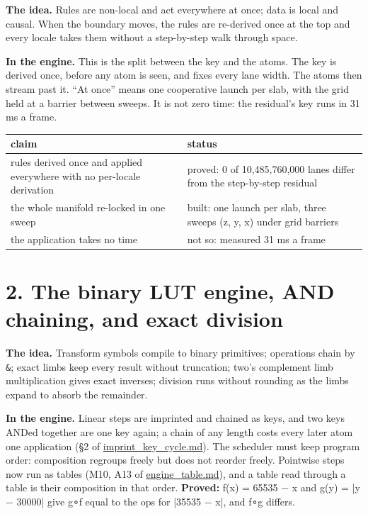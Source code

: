\textbf{The idea.} Rules are non-local and act everywhere at once; data is local and causal. When the boundary moves, the rules are re-derived once at the top and every locale takes them without a step-by-step walk through space.

\textbf{In the engine.} This is the split between the key and the atoms. The key is derived once, before any atom is seen, and fixes every lane width. The atoms then stream past it. “At once” means one cooperative launch per slab, with the grid held at a barrier between sweeps. It is not zero time: the residual's key runs in 31 ms a frame.

{\small
\setlength{\tabcolsep}{6pt}
\begin{longtable}{>{\RaggedRight\arraybackslash}p{}>{\RaggedRight\arraybackslash}p{}}
\toprule
claim & status \\
\midrule
\endhead
rules derived once and applied everywhere with no per-locale derivation & proved: 0 of 10,485,760,000 lanes differ from the step-by-step residual \\
the whole manifold re-locked in one sweep & built: one launch per slab, three sweeps (z, y, x) under grid barriers \\
the application takes no time & not so: measured 31 ms a frame \\
\bottomrule
\end{longtable}
}

\section{\texorpdfstring{2. The binary LUT engine, AND chaining, and exact division}{2. The binary LUT engine, AND chaining, and exact division}}

\textbf{The idea.} Transform symbols compile to binary primitives; operations chain by \texttt{\&}; exact limbs keep every result without truncation; two's complement limb multiplication gives exact inverses; division runs without rounding as the limbs expand to absorb the remainder.

\textbf{In the engine.} Linear steps are imprinted and chained as keys, and two keys ANDed together are one key again; a chain of any length costs every later atom one application (§2 of \hyperref[chap:imprint-key-cycle]{imprint\_\allowbreak{}key\_\allowbreak{}cycle.md}). The scheduler must keep program order: composition regroups freely but does not reorder freely. Pointwise steps now run as tables (M10, A13 of \hyperref[chap:engine-table]{engine\_\allowbreak{}table.md}), and a table read through a table is their composition in that order. \textbf{Proved:} f(x) = 65535 − x and g(y) = |y − 30000| give g∘f equal to the ops for |35535 − x|, and f∘g differs.

